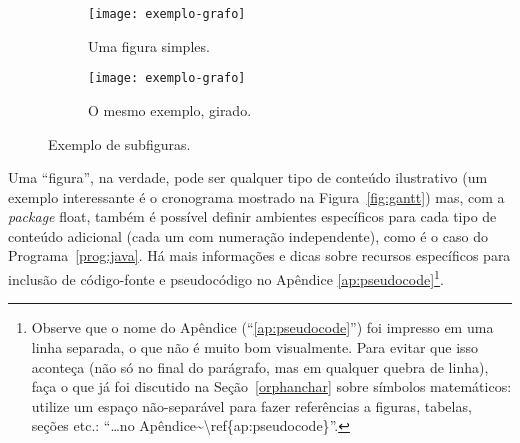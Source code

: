 \begin{figure}
  \centering

  \begin{subfigure}{0.4\textwidth}
    \centering
    \texttt{[image: exemplo-grafo]}
    \caption{Uma figura simples.\label{fig:subfigures:a}}
  \end{subfigure}
  \begin{subfigure}{0.4\textwidth}
    \centering
    \begin{turn}{90}
      \texttt{[image: exemplo-grafo]}
    \end{turn}
    \caption{O mesmo exemplo, girado.\label{fig:subfigures:b}}
  \end{subfigure}

  \caption{Exemplo de subfiguras.\label{fig:subfigures}}
\end{figure}

Uma ``figura'', na verdade, pode ser qualquer tipo de conteúdo ilustrativo
(um exemplo interessante é o cronograma mostrado na Figura~\ref{fig:gantt}) mas, com a
\textit{package} \textsf{float}, também é possível definir ambientes
específicos para cada tipo de conteúdo adicional (cada um com numeração
independente), como é o caso do Programa~\ref{prog:java}. Há
mais informações e dicas sobre recursos específicos para inclusão de
código-fonte e pseudocódigo no Apêndice \ref{ap:pseudocode}\footnote{
Observe que o nome do Apêndice (``\ref{ap:pseudocode}'') foi impresso em
uma linha separada, o que não é muito bom visualmente. Para evitar que isso
aconteça (não só no final do parágrafo, mas em qualquer quebra de linha),
faça o que já foi discutido na Seção~\ref{orphanchar} sobre símbolos
matemáticos: utilize um espaço não-separável para fazer referências a
figuras, tabelas, seções etc.: ``\textsf{\dots no
Apêndice\textasciitilde\textbackslash{}ref\{ap:pseudocode\}}''.}.


